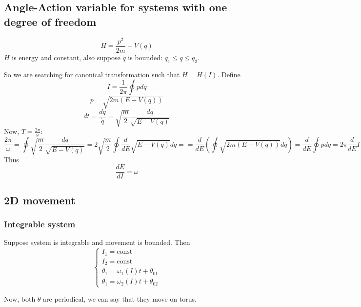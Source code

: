 \subsection{Angle-Action variable for systems with one degree of freedom}
$$H = \frac{p^2}{2m} + V(q)$$
$H$ is energy and constant, also suppose $q$ is bounded: $q_1 \leq q \leq q_2$.

So we are searching for canonical transformation such that $H = H(I)$. Define
$$I = \frac{1}{2\pi} \oint p dq$$
$$p = \sqrt{2m(E-V(q))}$$
$$dt = \frac{dq}{\dot{q}} = \sqrt{\frac{m}{2}}\frac{dq}{\sqrt{E-V(q)}}$$
Now, $T=\frac{2\pi}{\omega}$:
$$\frac{2\pi}{\omega} = \oint \sqrt{\frac{m}{2}}\frac{dq}{\sqrt{E-V(q)}} = 2\sqrt{\frac{m}{2}} \oint  \frac{d}{dE}\sqrt{E-V(q)} dq = =\frac{d}{dE} \left(\oint  \sqrt{2m(E-V(q))} dq\right) = \frac{d}{dE}\oint p dq = 2\pi \frac{d}{dE}  I $$
Thus
$$\frac{dE}{dI} = \omega $$
\subsection{2D movement}
\subsubsection{Integrable system}
Suppose system is integrable and movement is bounded. Then
$$\begin{cases}
I_1 = \text{const}\\I_2 = \text{const}\\\theta_1 = \omega_1(I) t + \theta_{01}\\\theta_1 = \omega_2(I) t + \theta_{02}
\end{cases}$$

Now, both $\theta$ are periodical, we can say that they move on torus.
